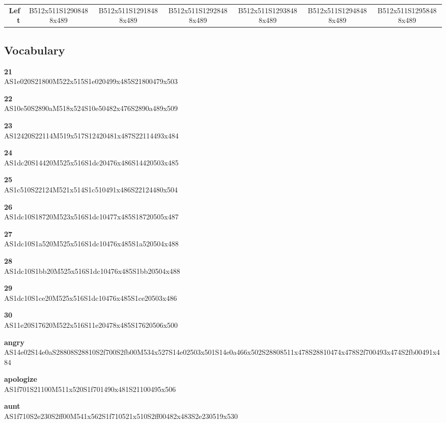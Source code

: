 \documentclass{article}
\begin{document}
\begin{center}
\begin{tabular}{r*{6}{c}}
\textbf{Left}&
B512x511S12908488x489&
B512x511S12918488x489&
B512x511S12928488x489&
B512x511S12938488x489&
B512x511S12948488x489&
B512x511S12958488x489\\
\end{tabular}
\end{center}

\subsection{Vocabulary}

\begin{glossary}

\textbf{21}\\
AS1e020S21800M522x515S1e020499x485S21800479x503

\textbf{22}\\
AS10e50S2890aM518x524S10e50482x476S2890a489x509

\textbf{23}\\
AS12420S22114M519x517S12420481x487S22114493x484

\textbf{24}\\
AS1dc20S14420M525x516S1dc20476x486S14420503x485

\textbf{25}\\
AS1c510S22124M521x514S1c510491x486S22124480x504

\textbf{26}\\
AS1dc10S18720M523x516S1dc10477x485S18720505x487

\textbf{27}\\
AS1dc10S1a520M525x516S1dc10476x485S1a520504x488

\textbf{28}\\
AS1dc10S1bb20M525x516S1dc10476x485S1bb20504x488

\textbf{29}\\
AS1dc10S1ce20M525x516S1dc10476x485S1ce20503x486

\textbf{30}\\
AS11e20S17620M522x516S11e20478x485S17620506x500

\textbf{angry}\\
AS14e02S14e0aS28808S28810S2f700S2fb00M534x527S14e02503x501S14e0a466x502S28808511x478S28810474x478S2f700493x474S2fb00491x484

\textbf{apologize}\\
AS1f701S21100M511x520S1f701490x481S21100495x506

\textbf{aunt}\\
AS1f710S2e230S2ff00M541x562S1f710521x510S2ff00482x483S2e230519x530


\end{glossary}
\end{document}
